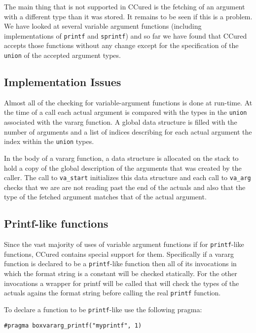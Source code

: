 \documentclass{book}
\def\t#1{{\tt #1}}
\begin{document}
 The main thing that is not supported in CCured is the fetching of an argument
with a different type than it was stored. It remains to be seen if this is a
problem. We have looked at several variable argument functions (including
implementations of \t{printf} and \t{sprintf}) and so far we have found that
CCured accepts those functions without any change except for the specification
of the \t{union} of the accepted argument types. 

           \subsection{Implementation Issues}

 Almost all of the checking for variable-argument functions is done at
run-time. At the time of a call each actual argument is compared with the
types in the \t{union} associated with the vararg function. A global data
structure is filled with the number of arguments and a list of indices
describing for each actual argument the index within the \t{union} types. 

 In the body of a vararg function, a data structure is allocated on the stack
to hold a copy of the global description of the arguments that was created by
the caller. The call to \t{va\_start} initializes this data structure and each
call to \t{va\_arg} checks that we are are not reading past the end of the
actuals and also that the type of the fetched argument matches that of the
actual argument. 

         \subsection{Printf-like functions}

 Since the vast majority of uses of variable argument functions if for
\t{printf}-like functions, CCured contains special support for them.
Specifically if a vararg function is declared to be a \t{printf}-like function
then all of its invocations in which the format string is a constant will be
checked statically. For the other invocations a wrapper for printf will be
called that will check the types of the actuals agains the format string
before calling the real \t{printf} function.

 To declare a function to be \t{printf}-like use the following pragma:
\begin{verbatim}
#pragma boxvararg_printf("myprintf", 1)
\end{verbatim}
\end{document}
